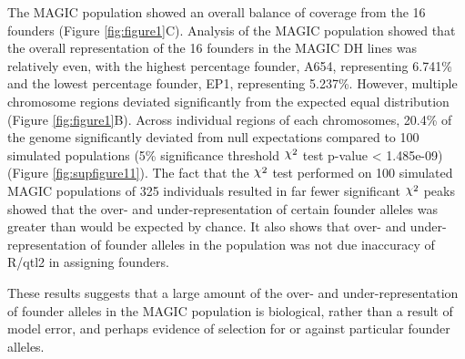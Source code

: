 \documentclass[article,9pt,twocolumn,twoside]{rilabRxiv}
\DeclareRobustCommand{\rchi}{{\mathpalette\irchi\relax}}
\newcommand{\irchi}[2]{\raisebox{\depth}{$#1\chi$}} %
\begin{document}
The MAGIC population showed an overall balance of coverage from the 16 founders (Figure \ref{fig:figure1}C).
Analysis of the MAGIC population showed that the overall representation of the 16 founders in the MAGIC DH lines was relatively even, with the highest percentage founder, A654, representing 6.741\% and the lowest percentage founder, EP1, representing 5.237\%.
However, multiple chromosome regions deviated significantly from the expected equal distribution (Figure \ref{fig:figure1}B).
Across individual regions of each chromosomes, 20.4\% of the genome significantly deviated from null expectations compared to 100 simulated populations (5\% significance threshold $\rchi^2$ test p-value < 1.485e-09) (Figure \ref{fig:supfigure11}).
The fact that the $\rchi^2$ test performed on 100 simulated MAGIC populations of 325 individuals resulted in far fewer significant $\rchi^2$ peaks showed that the over- and under-representation of certain founder alleles was greater than would be expected by chance.
It also shows that over- and under-representation of founder alleles in the population was not due inaccuracy of R/qtl2 in assigning founders.

These results suggests that a large amount of the over- and under-representation of founder alleles in the MAGIC population is biological, rather than a result of model error, and perhaps evidence of selection for or against particular founder alleles.
\end{document}
